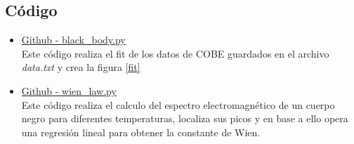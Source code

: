 \documentclass[12pt,letterpaper]{article}
\begin{document}
\begin{multicols}{2}
\section*{Código}
\begin{itemize}
\item \href{https://github.com/giovannilopez9808/Notas_Agosto_2020/blob/master/AMC/Reto1/black_body.py}{Github - black\_body.py}\\
Este código realiza el fit de los datos de COBE guardados en el archivo  \textit{data.txt} y crea la figura \ref{fit}
\item \href{https://github.com/giovannilopez9808/Notas_Agosto_2020/blob/master/AMC/Reto1/wien_law.py}{Github - wien\_law.py}\\
Este código realiza el calculo del espectro electromagnético de un cuerpo negro para diferentes temperaturas, localiza sus picos y en base a ello opera una regresión lineal para obtener la constante de Wien.
\end{itemize}


\nocite{*}
\end{multicols}
\end{document}
